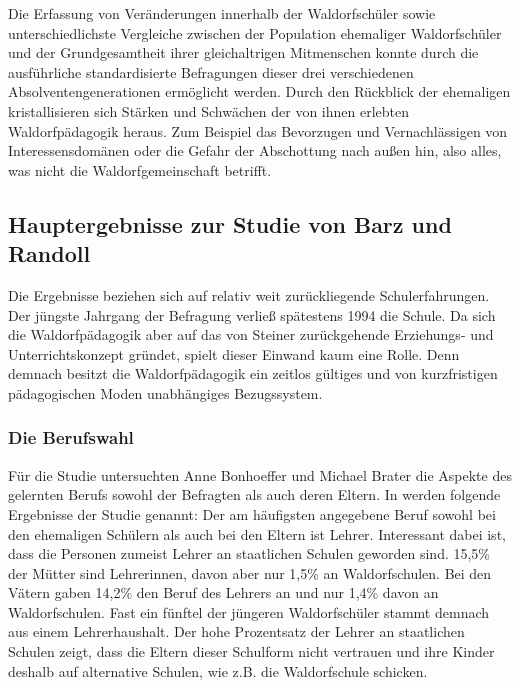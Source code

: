 Die Erfassung von Veränderungen innerhalb der Waldorfschüler sowie unterschiedlichste Vergleiche zwischen der Population ehemaliger Waldorfschüler und der Grundgesamtheit ihrer gleichaltrigen Mitmenschen konnte durch die ausführliche standardisierte Befragungen dieser drei verschiedenen Absolventengenerationen ermöglicht werden. 
Durch den Rückblick der ehemaligen kristallisieren sich Stärken und Schwächen der von ihnen erlebten Waldorfpädagogik heraus.
Zum Beispiel das Bevorzugen und Vernachlässigen von Interessensdomänen oder die Gefahr der Abschottung nach außen hin, also alles, was nicht die Waldorfgemeinschaft betrifft.  \citep[Vgl.][S. 12]{randoll07}

\subsection{Hauptergebnisse zur Studie von Barz und Randoll} %
\label{sub:hauptergebnisse}


Die Ergebnisse beziehen sich auf relativ weit zurückliegende Schulerfahrungen. 
Der jüngste Jahrgang der Befragung verließ spätestens 1994 die Schule. 
Da sich die Waldorfpädagogik aber auf das von Steiner zurückgehende Erziehungs- und Unterrichtskonzept gründet, spielt dieser Einwand kaum eine Rolle. 
Denn demnach besitzt die Waldorfpädagogik ein zeitlos gültiges und von kurzfristigen pädagogischen Moden unabhängiges Bezugssystem. \citep[Vgl.][S. 16]{randoll07}

\subsubsection{Die Berufswahl}
\label{subsub:Berufswahl}

Für die Studie untersuchten Anne Bonhoeffer und Michael Brater die Aspekte des gelernten Berufs sowohl der Befragten als auch deren Eltern. 
In \citet[][S. 16f]{randoll07} werden folgende Ergebnisse der Studie genannt: Der am häufigsten angegebene Beruf sowohl bei den ehemaligen Schülern als auch bei den Eltern ist Lehrer. 
Interessant dabei ist, dass die Personen zumeist Lehrer an staatlichen Schulen geworden sind. 
15,5\% der Mütter sind Lehrerinnen, davon aber nur 1,5\% an Waldorfschulen. 
Bei den Vätern gaben 14,2\% den Beruf des Lehrers an und nur 1,4\% davon an Waldorfschulen. 
Fast ein fünftel der jüngeren Waldorfschüler stammt demnach aus einem Lehrerhaushalt. 
Der hohe Prozentsatz der Lehrer an staatlichen Schulen zeigt, dass die Eltern dieser Schulform nicht vertrauen und ihre Kinder deshalb auf alternative Schulen, wie z.B. die Waldorfschule schicken.

